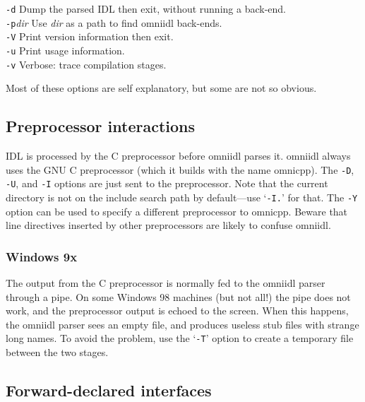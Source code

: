 \documentclass[11pt,oneside,a4paper]{book}
\newcommand{\cmdline}[1]{\texttt{#1}}
\begin{document}
\begin{tabbing}
\cmdline{-d}
     \> Dump the parsed IDL then exit, without running a back-end.\\

\cmdline{-p}\textit{dir}
     \> Use \textit{dir} as a path to find omniidl back-ends.\\

\cmdline{-V}
     \> Print version information then exit.\\

\cmdline{-u}
     \> Print usage information.\\

\cmdline{-v}
     \> Verbose: trace compilation stages.\\

\end{tabbing}

\noindent Most of these options are self explanatory, but some are not
so obvious.

\subsection{Preprocessor interactions}

IDL is processed by the C preprocessor before omniidl parses it.
omniidl always uses the GNU C preprocessor (which it builds with the
name omnicpp). The \cmdline{-D}, \cmdline{-U}, and \cmdline{-I}
options are just sent to the preprocessor. Note that the current
directory is not on the include search path by default---use
`\cmdline{-I.}' for that. The \cmdline{-Y} option can be used to
specify a different preprocessor to omnicpp. Beware that line
directives inserted by other preprocessors are likely to confuse
omniidl.

\subsubsection{Windows 9x}

The output from the C preprocessor is normally fed to the omniidl
parser through a pipe. On some Windows 98 machines (but not all!)  the
pipe does not work, and the preprocessor output is echoed to the
screen. When this happens, the omniidl parser sees an empty file, and
produces useless stub files with strange long names. To avoid the
problem, use the `\cmdline{-T}' option to create a temporary file
between the two stages.


\subsection{Forward-declared interfaces}
\end{document}
